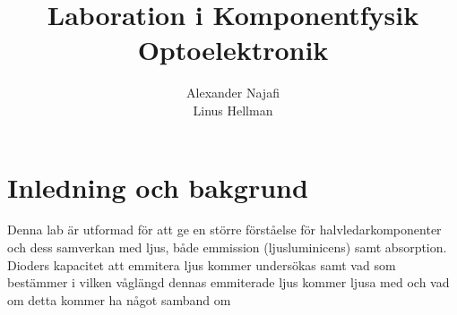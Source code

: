 \documentclass[a4paper]{article}
\title{Laboration i Komponentfysik\\ Optoelektronik}
\author{Alexander Najafi \\ Linus Hellman}
\begin{document}
\maketitle
\thispagestyle{empty}
\newpage

\tableofcontents
\newpage

\section{Inledning och bakgrund}

Denna lab är utformad för att ge en större förståelse för halvledarkomponenter och dess samverkan med ljus, både emmission (ljusluminicens) samt absorption. Dioders kapacitet att emmitera ljus kommer undersökas samt vad som bestämmer i vilken våglängd dennas emmiterade ljus kommer ljusa med och vad om detta kommer ha något samband om 
\end{document}
